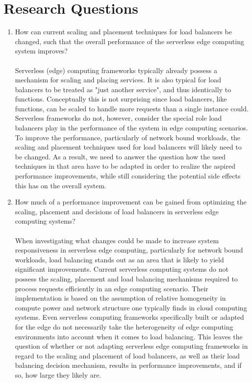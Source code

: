\section{Research Questions}

\begin{enumerate}
        \item How can current scaling and placement techniques for load balancers be changed, such that the overall performance of the serverless edge computing system improves?\\\\
    Serverless (edge) computing frameworks typically already possess a mechanism for scaling and placing services. It is also typical for load balancers to be treated as "just another service", and thus identically to functions\cite{openfaas}.
    Conceptually this is not surprising since load balancers, like functions, can be scaled to handle more requests than a single instance could.
    Serverless frameworks do not, however, consider the special role load balancers play in the performance of the system in edge computing scenarios.
    To improve the performance, particularly of network bound workloads, the scaling and placement techniques used for load balancers will likely need to be changed. As a result, we need to answer the question how the used techniques in that area have to be adapted in order to realize the aspired performance improvements, while still considering the potential side effects this has on the overall system.

        \item How much of a performance improvement can be gained from optimizing the scaling, placement and decisions of load balancers in serverless edge computing systems?\\\\
    When investigating what changes could be made to increase system responsiveness in serverless edge computing, particularly for network bound workloads, load balancing stands out as an area that is likely to yield significant improvements. Current serverless computing systems do not possess the scaling, placement and load balancing mechanisms required to process requests efficiently in an edge computing scenario. Their implementation is based on the assumption of relative homogeneity in compute power and network structure one typically finds in cloud computing systems. Even serverless computing frameworks specifically built or adapted for the edge do not necessarily take the heterogeneity of edge computing environments into account when it comes to load balancing\cite{skippy}.
    This leaves the question of whether or not adapting serverless edge computing frameworks in regard to the scaling and placement of load balancers, as well as their load balancing decision mechanism, results in performance improvements, and if so, how large they likely are.
    

\end{enumerate}
